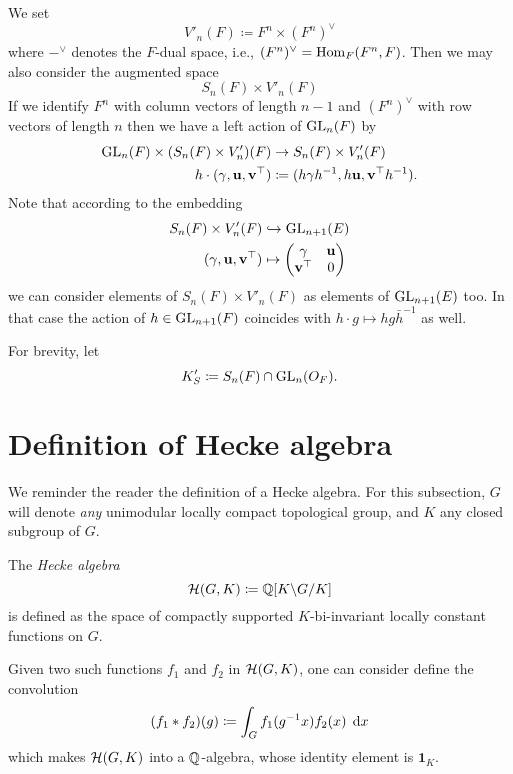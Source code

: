 \begin{definition}
  We set
  \[ V'_n(F) \coloneqq F^n \times (F^n)^\vee \]
  where $-^\vee$ denotes the $F$-dual space, i.e., $(F^n)^\vee = \operatorname{Hom}_F(F^n, F)$.
  Then we may also consider the augmented space
  \[ S_n(F) \times V'_n(F) \]
  If we identify $F^n$ with column vectors of length $n-1$ and $(F^n)^\vee$
  with row vectors of length $n$ then we have a left action of $\operatorname{GL}_n(F)$ by
  \begin{align*}
    \operatorname{GL}_n(F) \times (S_n(F) \times V'_n)(F)
    &\to S_n(F) \times V'_n(F) \\
    h \cdot (\gamma, \mathbf u, \mathbf v^\top)
    &\coloneqq (h \gamma h^{-1}, h\mathbf u, \mathbf v^\top h^{-1}).
  \end{align*}
  Note that according to the embedding
  \begin{align*}
    S_n(F) \times V'_n(F)
    &\hookrightarrow \operatorname{GL}_{n+1}(E) \\
    (\gamma, \mathbf u, \mathbf v^\top)
    &\mapsto \begin{pmatrix} \gamma & \mathbf u \\ \mathbf v^\top & 0 \end{pmatrix}
  \end{align*}
  we can consider elements of $S_n(F) \times V'_n(F)$ as elements of $\operatorname{GL}_{n+1}(E)$ too.
  In that case the action of $h \in \operatorname{GL}_{n+1}(F)$
  coincides with $h \cdot g \mapsto hg\bar{h}^{-1}$ as well.
\end{definition}

\begin{definition}
  For brevity, let
   \[ K'_S \coloneqq S_n(F) \cap \operatorname{GL}_n(O_F). \]
\end{definition}

\section{Definition of Hecke algebra}
We reminder the reader the definition of a Hecke algebra.
For this subsection, $G$ will denote \emph{any}
unimodular locally compact topological group,
and $K$ any closed subgroup of $G$.

\begin{definition}
  The \emph{Hecke algebra}
  \[ \mathcal H(G, K) \coloneqq \mathbb Q[K \backslash G \slash K] \]
  is defined as the space of compactly supported $K$-bi-invariant
  locally constant functions on $G$.

  Given two such functions $f_1$ and $f_2$ in $\mathcal H(G,K)$,
  one can consider define the convolution
  \[ (f_1 \ast f_2)(g) \coloneqq \int_G f_1(g\inv x) f_2(x) \; \odif x \]
  which makes $\mathcal H(G, K)$ into a $\mathbb Q$-algebra,
  whose identity element is $\mathbf{1}_K$.
\end{definition}

